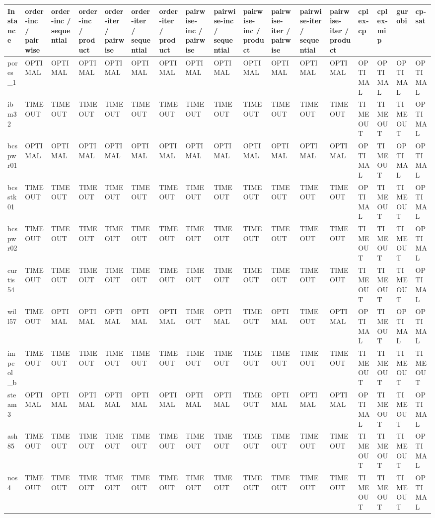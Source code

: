 \begin{tabular}{lllllllllllllllll}
\hline
Instance & order-inc / pairwise & order-inc / sequential & order-inc / product & order-iter / pairwise & order-iter / sequential & order-iter / product & pairwise-inc / pairwise & pairwise-inc / sequential & pairwise-inc / product & pairwise-iter / pairwise & pairwise-iter / sequential & pairwise-iter / product & cplex-cp & cplex-mip & gurobi & cp-sat \\
\hline
pores\_1 & OPTIMAL & OPTIMAL & OPTIMAL & OPTIMAL & OPTIMAL & OPTIMAL & OPTIMAL & OPTIMAL & OPTIMAL & OPTIMAL & OPTIMAL & OPTIMAL & OPTIMAL & OPTIMAL & OPTIMAL & OPTIMAL \\
ibm32 & TIMEOUT & TIMEOUT & TIMEOUT & TIMEOUT & TIMEOUT & TIMEOUT & TIMEOUT & TIMEOUT & TIMEOUT & TIMEOUT & TIMEOUT & TIMEOUT & TIMEOUT & TIMEOUT & TIMEOUT & OPTIMAL \\
bcspwr01 & OPTIMAL & OPTIMAL & OPTIMAL & OPTIMAL & OPTIMAL & OPTIMAL & OPTIMAL & OPTIMAL & OPTIMAL & OPTIMAL & OPTIMAL & OPTIMAL & OPTIMAL & TIMEOUT & OPTIMAL & OPTIMAL \\
bcsstk01 & TIMEOUT & TIMEOUT & TIMEOUT & TIMEOUT & TIMEOUT & TIMEOUT & TIMEOUT & TIMEOUT & TIMEOUT & TIMEOUT & TIMEOUT & TIMEOUT & OPTIMAL & TIMEOUT & TIMEOUT & OPTIMAL \\
bcspwr02 & TIMEOUT & TIMEOUT & TIMEOUT & TIMEOUT & TIMEOUT & TIMEOUT & TIMEOUT & TIMEOUT & TIMEOUT & TIMEOUT & TIMEOUT & TIMEOUT & TIMEOUT & TIMEOUT & TIMEOUT & OPTIMAL \\
curtis54 & TIMEOUT & TIMEOUT & TIMEOUT & TIMEOUT & TIMEOUT & TIMEOUT & TIMEOUT & TIMEOUT & TIMEOUT & TIMEOUT & TIMEOUT & TIMEOUT & TIMEOUT & TIMEOUT & TIMEOUT & OPTIMAL \\
will57 & TIMEOUT & OPTIMAL & OPTIMAL & OPTIMAL & OPTIMAL & OPTIMAL & TIMEOUT & OPTIMAL & TIMEOUT & OPTIMAL & TIMEOUT & OPTIMAL & OPTIMAL & TIMEOUT & OPTIMAL & OPTIMAL \\
impcol\_b & TIMEOUT & TIMEOUT & TIMEOUT & TIMEOUT & TIMEOUT & TIMEOUT & TIMEOUT & TIMEOUT & TIMEOUT & TIMEOUT & TIMEOUT & TIMEOUT & TIMEOUT & TIMEOUT & TIMEOUT & TIMEOUT \\
steam3 & OPTIMAL & OPTIMAL & OPTIMAL & OPTIMAL & OPTIMAL & OPTIMAL & OPTIMAL & OPTIMAL & TIMEOUT & OPTIMAL & OPTIMAL & OPTIMAL & OPTIMAL & TIMEOUT & TIMEOUT & OPTIMAL \\
ash85 & TIMEOUT & TIMEOUT & TIMEOUT & TIMEOUT & TIMEOUT & TIMEOUT & TIMEOUT & TIMEOUT & TIMEOUT & TIMEOUT & TIMEOUT & TIMEOUT & TIMEOUT & TIMEOUT & TIMEOUT & OPTIMAL \\
nos4 & TIMEOUT & TIMEOUT & TIMEOUT & TIMEOUT & TIMEOUT & TIMEOUT & TIMEOUT & TIMEOUT & TIMEOUT & TIMEOUT & TIMEOUT & TIMEOUT & TIMEOUT & TIMEOUT & TIMEOUT & OPTIMAL \\

\end{tabular}
